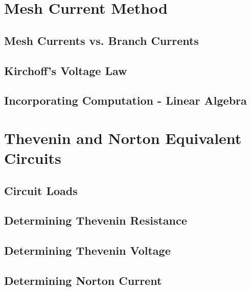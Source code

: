 \documentclass[a4paper,11pt]{book}
\begin{document}
\chapter{Mesh Current Method}
\section{Mesh Currents vs. Branch Currents}
\section{Kirchoff's Voltage Law}
\section{Incorporating Computation - Linear Algebra}
\chapter{Thevenin and Norton Equivalent Circuits}
\section{Circuit Loads}
\section{Determining Thevenin Resistance}
\section{Determining Thevenin Voltage}
\section{Determining Norton Current}
\end{document}
